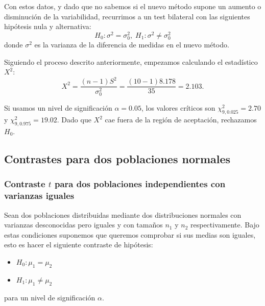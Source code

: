 \documentclass[a4paper,12pt]{article}
\begin{document}
    Con estos datos, y dado que no sabemos si el nuevo método supone un aumento o disminución de la variabilidad, recurrimos a un test bilateral con las siguientes hipótesis nula y alternativa:
    \begin{equation}
        H_0 : \sigma^2 = \sigma_0^2, \;
        H_1 : \sigma^2 \neq \sigma_0^2
    \end{equation}
    donde $\sigma^2$ es la varianza de la diferencia de medidas en el nuevo método.

    Siguiendo el proceso descrito anteriormente, empezamos calculando el estadístico $X^2$:
    \begin{equation}
        X^2
        =
        \frac{(n-1)S^2}{\sigma_0^2}
        =
        \frac{(10 - 1) 8.178}{35}
        =
        2.103
        .
    \end{equation}

    Si usamos un nivel de significación $\alpha = 0.05$, los valores críticos son $\chi^2_{9, 0.025} = 2.70$ y $\chi^2_{9,0.975} = 19.02$. 
    Dado que $X^2$ cae fuera de la región de aceptación, rechazamos $H_0$.



\subsection{Contrastes para dos poblaciones normales}

\subsubsection{Contraste $t$ para dos poblaciones independientes con varianzas iguales}
\label{sec:t_2samplessamevar}

    Sean dos poblaciones distribuidas mediante dos distribuciones normales con varianzas desconocidas pero iguales y con tamaños $n_1$ y $n_2$ respectivamente.
    Bajo estas condiciones suponemos que queremos comprobar si sus medias son iguales, esto es hacer el siguiente contraste de hipótesis:
\begin{itemize}
	\item $H_0:\mu_1=\mu_2$
	\item $H_1:\mu_1\neq \mu_2$
\end{itemize}
para un nivel de significación $\alpha$.
\end{document}
